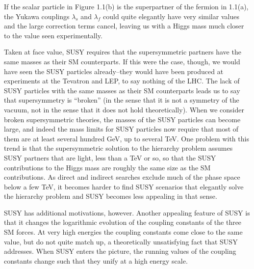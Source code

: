 If the scalar particle in Figure 1.1(b) is the superpartner of the fermion in 1.1(a),
the Yukawa couplings $\lambda_s$ and $\lambda_f$ could quite elegantly have very 
similar values and the large correction terms cancel, leaving us with a Higgs mass
much closer to the value seen experimentally. 

Taken at face value, SUSY requires that the supersymmetric partners have the same masses 
as their SM counterparts.  If this were the case, though, we would 
have seen the SUSY particles already--they would have been produced at experiments
at the Tevatron and LEP, to say nothing of the LHC.
The lack of SUSY particles with the same masses as their SM counterparts 
leads us to say that supersymmetry is ``broken'' (in the sense 
that it is not a symmetry of the vacuum, not in the sense that 
it does not hold theoretically).  When we consider broken supersymmetric theories, the 
masses of the SUSY particles can become large, and indeed the mass limits for 
SUSY particles now require that most of them are at least several hundred GeV, up 
to several TeV.  One problem with this trend is that the supersymmetric solution to 
the hierarchy problem assumes SUSY partners that are light, less than a TeV or 
so, so that the SUSY contributions to the Higgs mass are roughly the same 
size as the SM contributions.  As direct and indirect searches exclude much of the 
phase space below a few TeV, it becomes harder to find SUSY scenarios that 
elegantly solve the hierarchy problem and SUSY becomes less appealing in that sense. 

SUSY has additional motivations, however.  Another appealing feature of SUSY is that it 
changes the logarithmic evolution of the coupling constants of the three SM forces.  At very high energies the 
coupling constants come close to the same value, but do not quite match up, 
a theoretically unsatisfying fact that SUSY addresses.  When SUSY enters the picture, the 
running values of the coupling constants change such that they unify at a high energy scale.

